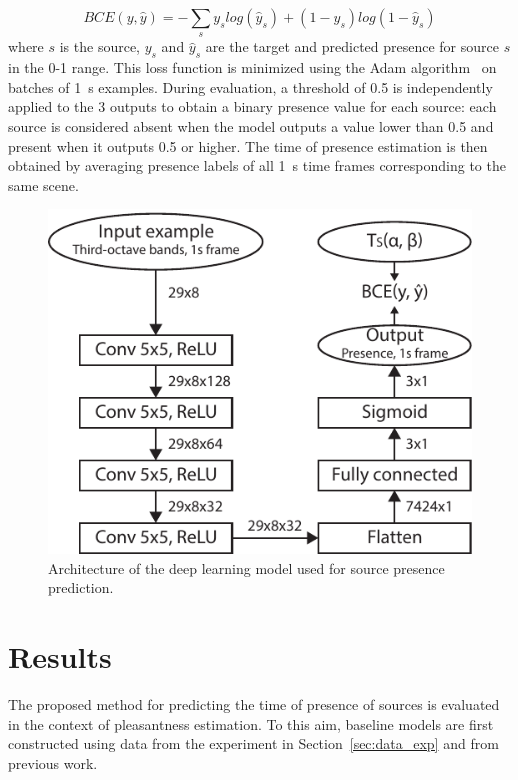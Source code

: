\documentclass[twocolumn]{article}
\begin{document}
\begin{equation}
BCE(y, \hat y) = -\sum_s y_s log\left(\hat y_s\right) + (1-y_s) log\left(1-\hat y_s\right)
\end{equation}
where $s$ is the source, $y_s$ and $\hat y_s$ are the target and predicted presence for source $s$ in the 0-1 range. This loss function is minimized using the Adam algorithm~\cite{kingma2015} on batches of 1~s examples. During evaluation, a threshold of 0.5 is independently applied to the 3 outputs to obtain a binary presence value for each source: each source is considered absent when the model outputs a value lower than 0.5 and present when it outputs 0.5 or higher. The time of presence estimation is then obtained by averaging presence labels of all 1~s time frames corresponding to the same scene.

\begin{figure}[t]
    \centering
    \includegraphics[width=\columnwidth]{figures/deep_arch.pdf}
    \caption{Architecture of the deep learning model used for source presence prediction.}\label{fig:deep_arch}
\end{figure}

\section{Results}
\label{sec:results}

The proposed method for predicting the time of presence of sources is evaluated in the context of pleasantness estimation. To this aim, baseline models are first constructed using data from the experiment in Section~\ref{sec:data_exp} and from previous work.
\end{document}
